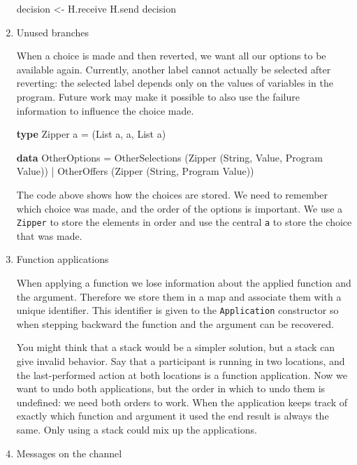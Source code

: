 \documentclass[runningheads,plain]{llncs}
\newenvironment{Shaded}{}{}
\newcommand{\KeywordTok}[1]{\textcolor[rgb]{0.00,0.44,0.13}{\textbf{#1}}}
\newcommand{\DataTypeTok}[1]{\textcolor[rgb]{0.56,0.13,0.00}{#1}}
\newcommand{\OtherTok}[1]{\textcolor[rgb]{0.00,0.44,0.13}{#1}}
\newcommand{\FunctionTok}[1]{\textcolor[rgb]{0.02,0.16,0.49}{#1}}
\newcommand{\NormalTok}[1]{#1}
\begin{document}
\begin{enumerate}
\begin{Shaded}
\begin{Highlighting}[]
\NormalTok{decision }\OtherTok{<-}\NormalTok{ H.receive}
\NormalTok{H.send decision}
\end{Highlighting}
\end{Shaded}
\item
  Unused branches

  When a choice is made and then reverted, we want all our options to be
  available again. Currently, another label cannot actually be selected
  after reverting: the selected label depends only on the values of
  variables in the program. Future work may make it possible to also use
  the failure information to influence the choice made.

\begin{Shaded}
\begin{Highlighting}[]
\KeywordTok{type} \DataTypeTok{Zipper}\NormalTok{ a }\FunctionTok{=}\NormalTok{ (}\DataTypeTok{List}\NormalTok{ a, a, }\DataTypeTok{List}\NormalTok{ a)}

\KeywordTok{data} \DataTypeTok{OtherOptions}
    \FunctionTok{=} \DataTypeTok{OtherSelections}\NormalTok{ (}\DataTypeTok{Zipper}\NormalTok{ (}\DataTypeTok{String}\NormalTok{, }\DataTypeTok{Value}\NormalTok{, }\DataTypeTok{Program} \DataTypeTok{Value}\NormalTok{))}
    \FunctionTok{|} \DataTypeTok{OtherOffers}\NormalTok{ (}\DataTypeTok{Zipper}\NormalTok{ (}\DataTypeTok{String}\NormalTok{, }\DataTypeTok{Program} \DataTypeTok{Value}\NormalTok{))}
\end{Highlighting}
\end{Shaded}

  The code above shows how the choices are stored. We need to remember
  which choice was made, and the order of the options is important. We
  use a \texttt{Zipper} to store the elements in order and use the
  central \texttt{a} to store the choice that was made.
\item
  Function applications

  When applying a function we lose information about the applied
  function and the argument. Therefore we store them in a map and
  associate them with a unique identifier. This identifier is given to
  the \texttt{Application} constructor so when stepping backward the
  function and the argument can be recovered.

  You might think that a stack would be a simpler solution, but a stack
  can give invalid behavior. Say that a participant is running in two
  locations, and the last-performed action at both locations is a
  function application. Now we want to undo both applications, but the
  order in which to undo them is undefined: we need both orders to work.
  When the application keeps track of exactly which function and
  argument it used the end result is always the same. Only using a stack
  could mix up the applications.
\item
  Messages on the channel


\end{enumerate}
\end{document}
